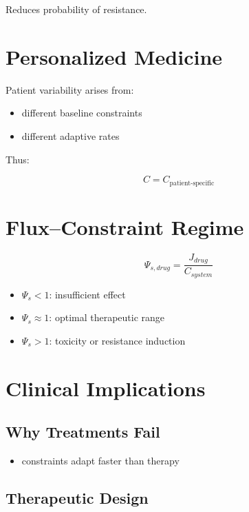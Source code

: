 \documentclass[11pt]{article}
\begin{document}
Reduces probability of resistance.

\section{Personalized Medicine}

Patient variability arises from:

\begin{itemize}
    \item different baseline constraints
    \item different adaptive rates
\end{itemize}

Thus:

\begin{equation}
C = C_{\mathrm{patient\text{-}specific}}
\end{equation}

\section{Flux–Constraint Regime}

\begin{equation}
\Psi_{s,drug} = \frac{J_{drug}}{C_{system}}
\end{equation}

\begin{itemize}
    \item $\Psi_s < 1$: insufficient effect
    \item $\Psi_s \approx 1$: optimal therapeutic range
    \item $\Psi_s > 1$: toxicity or resistance induction
\end{itemize}

\section{Clinical Implications}

\subsection{Why Treatments Fail}

\begin{itemize}
    \item constraints adapt faster than therapy
\end{itemize}

\subsection{Therapeutic Design}
\end{document}
